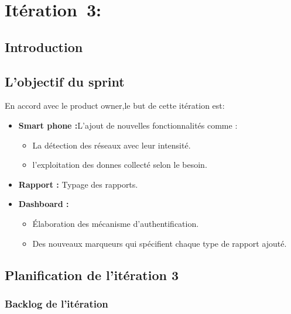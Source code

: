\section[Itération 3: ( 4/3/2017 - 4/28/2017 )]{Itération~3:~\textup{}}

\subsection{Introduction}
\subsection{L'objectif du sprint}
En accord avec le product owner,le but de cette itération est:
\begin{itemize}
 \item \textbf{Smart phone :}L’ajout de nouvelles fonctionnalités comme :
        \begin{itemize}
         \item La détection des réseaux avec leur intensité.
         \item l'exploitation des donnes collecté selon le besoin.
        \end{itemize}
\item \textbf{Rapport :} Typage des rapports.
\item \textbf{Dashboard :}
        \begin{itemize}
         \item Élaboration des mécanisme d'authentification.
         \item Des nouveaux marqueurs qui spécifient chaque type de rapport ajouté.
        \end{itemize}

\end{itemize}


\subsection{Planification de l'itération 3}

\subsubsection{Backlog de l'itération}

